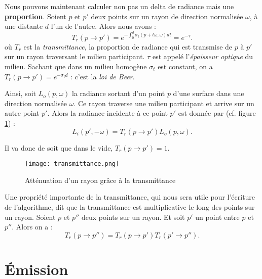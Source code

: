 Nous pouvons maintenant calculer non pas un delta de radiance mais une \textbf{proportion}. Soient $p$ et $p'$ deux points sur un rayon de direction normalisée $\omega$, à une distante $d$ l'un de l'autre. Alors nous avons :
\large \begin{equation} \label{eq:transmittance_definition}
    T_{r}(p\longrightarrow p') = e^{-\int_{0}^{d} \sigma_{t}(p+t\omega, \omega)dt} = e^{-\tau}
.\end{equation} \normalsize
où $T_{r}$ est la \textit{transmittance}, la proportion de radiance qui est transmise de $p$ à $p'$ sur un rayon traversant le milieu participant. $\tau$ est appelé l'\textit{épaisseur optique} du milieu. Sachant que dans un milieu homogène $\sigma_{t}$ est constant, on a $T_{r}(p\longrightarrow p') = e^{-\sigma_{t}d}$ : c'est la \textit{loi de Beer}.\par
Ainsi, soit $L_{o}(p, \omega)$ la radiance sortant d'un point $p$ d'une surface dans une direction normalisée $\omega$. Ce rayon traverse une milieu participant et arrive sur un autre point $p'$. Alors la radiance incidente à ce point $p'$ est donnée par (cf. figure \ref{fig:transmittance}) :
\large \begin{equation}
    L_{i}(p', -\omega) = T_{r}(p\longrightarrow p')L_{o}(p, \omega)
.\end{equation} \normalsize \par

Il va donc de soit que dans le vide, $T_{r}(p\longrightarrow p') = 1$.

\begin{figure}[h!]\label{fig:transmittance}
\centering
\texttt{[image: transmittance.png]}
\caption{Atténuation d'un rayon grâce à la transmittance}
\end{figure}

Une propriété importante de la transmittance, qui nous sera utile pour l'écriture de l'algorithme, dit que la transmittance est multiplicative le long des points sur un rayon. Soient $p$ et $p''$ deux points sur un rayon. Et soit $p'$ un point entre $p$ et $p''$. Alors on a :
\large \begin{equation}
    T_{r}(p\longrightarrow p'') = T_{r}(p\longrightarrow p')T_{r}(p'\longrightarrow p'')
.\end{equation} \normalsize

\section{Émission}

